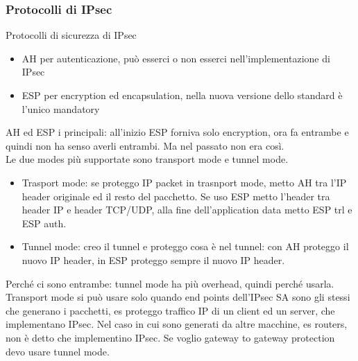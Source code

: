 \documentclass[16px]{article}
\begin{document}
\subsubsection{Protocolli di IPsec}
Protocolli di sicurezza di IPsec
\begin{itemize}
\item AH per autenticazione, può esserci o non esserci nell'implementazione di IPsec
\item ESP per encryption ed encapsulation, nella nuova versione dello standard è l'unico mandatory
\end{itemize}
AH ed ESP i principali: all'inizio ESP forniva solo encryption, ora fa entrambe e quindi non ha senso averli entrambi. Ma nel passato non era così.\\ Le due modes più supportate sono transport mode e tunnel mode.
\begin{itemize}
\item Trasport mode: se proteggo IP packet in trasnport mode, metto AH tra l'IP header originale ed il resto del pacchetto. Se uso ESP metto l'header tra header IP e header TCP/UDP, alla fine dell'application data metto ESP trl e ESP auth.
\item Tunnel mode: creo il tunnel e proteggo cosa è nel tunnel: con AH proteggo il nuovo IP header, in ESP proteggo sempre il nuovo IP header.
\end{itemize}
Perché ci sono entrambe: tunnel mode ha più overhead, quindi perché usarla. Transport mode si può usare solo quando end points dell'IPsec SA sono gli stessi che generano i pacchetti, es proteggo traffico IP di un client ed un server, che implementano IPsec. Nel caso in cui sono generati da altre macchine, es routers, non è detto che implementino IPsec. Se voglio gateway to gateway protection devo usare tunnel mode.
\end{document}
